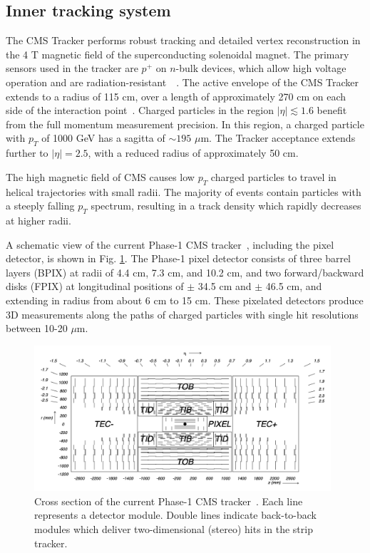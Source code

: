 \subsection{Inner tracking system}

The CMS Tracker performs robust tracking and detailed vertex reconstruction in the 4 T magnetic field of the superconducting solenoidal magnet. The primary sensors used in the tracker are $p^+$ on $n$-bulk devices, which allow high voltage operation and are radiation-resistant~\cite{CERN-LHCC-98-006}~\cite{CERN-LHCC-2017-009-tracker-phase2-tdr}. The active envelope of the CMS Tracker extends to a radius of 115 cm, over a length of approximately 270 cm on each side of the interaction point~\cite{CERN-LHCC-98-006}.
Charged particles in the region $|\eta| \lesssim 1.6$ benefit from the full momentum measurement precision. In this region, a charged particle with $p_T$ of 1000 GeV has a sagitta of $\sim 195$ $\mu$m. The Tracker acceptance extends further to $|\eta| = 2.5$, with a reduced radius of approximately 50 cm.

The high magnetic field of CMS causes low $p_{T}$ charged particles to travel in helical trajectories with small radii. The majority of events contain particles with a steeply falling $p_{T}$ spectrum, resulting in a track density which rapidly decreases at higher radii. 

A schematic view of the current Phase-1 CMS tracker~\cite{CMS-TDR-011-pixel}, including the pixel detector, is shown in Fig. \ref{fig:phase-1-tdr-tracker-schematic}. The Phase-1 pixel detector consists of three barrel layers (BPIX) at radii of 4.4 cm, 7.3 cm, and 10.2 cm, and two forward/backward disks (FPIX) at longitudinal positions of $\pm$ 34.5 cm and $\pm$ 46.5 cm, and extending in radius from about 6 cm to 15 cm. These pixelated detectors produce 3D measurements along the paths of charged particles with single hit resolutions between 10-20 $\mu$m. 


\begin{figure}[ht]
    \centering
    \includegraphics[width=11cm]{figures/ch-2-cern-cms/phase-1-tdr-tracker-schematic.png}
    \caption[Cross section of the current Phase-1 CMS tracker.]{Cross section of the current Phase-1 CMS tracker~\cite{CMS-TDR-011-pixel}. Each line represents a detector module. Double lines indicate back-to-back modules which deliver two-dimensional (stereo) hits in the strip tracker.}
    \label{fig:phase-1-tdr-tracker-schematic}
\end{figure}

